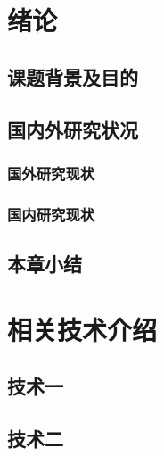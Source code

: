 \documentclass{article}
\begin{document}
    \pagestyle{fancy}
    \fancyhf{}
    \rhead{\thistitle}
    \renewcommand{\headrulewidth}{0.4pt}
    

    \clearpage
    \sanhaolineskip
    \section{绪论}
        \subsection{课题背景及目的}
            
        \subsection{国内外研究状况}
            \subsubsection{国外研究现状}
                
            \subsubsection{国内研究现状}
                
        \subsection{本章小结}
            

    \clearpage
    \sanhaolineskip
    \section{相关技术介绍}
        \subsection{技术一}
            
        \subsection{技术二}
            
\end{document}

